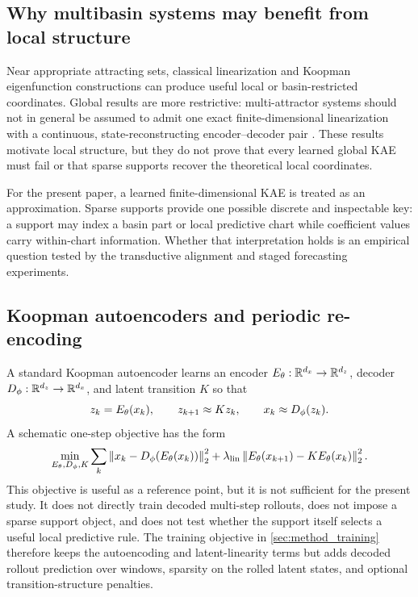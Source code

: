\subsection{Why multibasin systems may benefit from local structure}
\label{app:multibasin_background}

Near appropriate attracting sets, classical linearization and Koopman eigenfunction constructions can produce useful local or basin-restricted coordinates. Global results are more restrictive: multi-attractor systems should not in general be assumed to admit one exact finite-dimensional linearization with a continuous, state-reconstructing encoder--decoder pair \citep{lan_linearization_2013,brunton_koopman_2016,pan_lifting_2024,liu_properties_2025}. These results motivate local structure, but they do not prove that every learned global KAE must fail or that sparse supports recover the theoretical local coordinates.

For the present paper, a learned finite-dimensional KAE is treated as an approximation. Sparse supports provide one possible discrete and inspectable key: a support may index a basin part or local predictive chart while coefficient values carry within-chart information. Whether that interpretation holds is an empirical question tested by the transductive alignment and staged forecasting experiments.

\subsection{Koopman autoencoders and periodic re-encoding}
\label{app:kae_reencoding_background}

A standard Koopman autoencoder learns an encoder \(E_\theta:\mathbb{R}^{d_x}\to\mathbb{R}^{d_z}\), decoder \(D_\phi:\mathbb{R}^{d_z}\to\mathbb{R}^{d_x}\), and latent transition \(K\) so that
\begin{equation}
  z_k=E_\theta(x_k),\qquad z_{k+1}\approx Kz_k,\qquad x_k\approx D_\phi(z_k).
\end{equation}
A schematic one-step objective has the form
\begin{equation}
  \min_{E_\theta,D_\phi,K}
  \sum_k
  \left\lVert x_k-D_\phi(E_\theta(x_k)) \right\rVert_2^2
  +
  \lambda_{\rm lin}
  \left\lVert E_\theta(x_{k+1})-KE_\theta(x_k) \right\rVert_2^2 .
  \label{eq:KAE-standard-objective}
\end{equation}
This objective is useful as a reference point, but it is not sufficient for the present study. It does not directly train decoded multi-step rollouts, does not impose a sparse support object, and does not test whether the support itself selects a useful local predictive rule. The training objective in \cref{sec:method_training} therefore keeps the autoencoding and latent-linearity terms but adds decoded rollout prediction over windows, sparsity on the rolled latent states, and optional transition-structure penalties.

